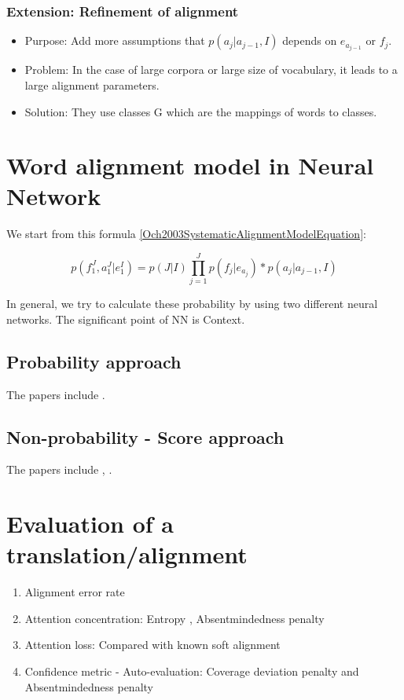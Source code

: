 \documentclass{article}
\begin{document}
\subsubsection{Extension: Refinement of alignment}

\begin{itemize}
\item Purpose: Add more assumptions that $p(a_j | a_{j-1}, I)$ depends on $e_{a_{j -1}}$ or $f_j$.
\item Problem: In the case of large corpora or large size of vocabulary, it leads to a large alignment parameters.
\item Solution: They use classes G which are the mappings of words to classes.
\end{itemize}

\section{Word alignment model in Neural Network}
We start from this formula \eqref{Och2003SystematicAlignmentModelEquation}:

\begin{equation}
p(f_1^J, a_1^J|e_1^I) = p(J|I) \prod_{j=1}^J p(f_j | e_{a_j}) * p(a_j | a_{j-1}, I)
\end{equation}

In general, we try to calculate these probability by using two different neural networks.
The significant point of NN is Context.

\subsection{Probability approach}
The papers include \cite{Tran16unsupervised}.


\subsection{Non-probability - Score approach}
The papers include \cite{Yang13word}, \cite{Tamura14recurrent}.




\section{Evaluation of a translation/alignment}
\begin{enumerate}
\item Alignment error rate
\item Attention concentration: Entropy \citep{Ghader2017what}, Absentmindedness penalty \citep{Rikters2017confidence}
\item Attention loss: Compared with known soft alignment
\item Confidence metric - Auto-evaluation: Coverage deviation penalty and Absentmindedness penalty \citep{Rikters2017confidence}

\end{enumerate}
\end{document}
